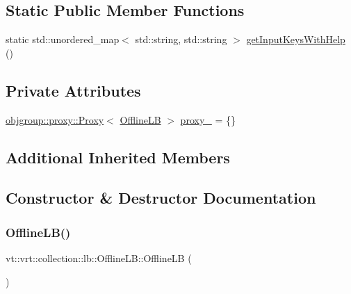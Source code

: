 \subsection*{Static Public Member Functions}
\begin{DoxyCompactItemize}
\item 
static std\+::unordered\+\_\+map$<$ std\+::string, std\+::string $>$ \hyperlink{structvt_1_1vrt_1_1collection_1_1lb_1_1_offline_l_b_a64d09cfd5734bc5b6a1e05dfaa0fbe96}{get\+Input\+Keys\+With\+Help} ()
\end{DoxyCompactItemize}
\subsection*{Private Attributes}
\begin{DoxyCompactItemize}
\item 
\hyperlink{structvt_1_1objgroup_1_1proxy_1_1_proxy}{objgroup\+::proxy\+::\+Proxy}$<$ \hyperlink{structvt_1_1vrt_1_1collection_1_1lb_1_1_offline_l_b}{Offline\+LB} $>$ \hyperlink{structvt_1_1vrt_1_1collection_1_1lb_1_1_offline_l_b_a38da27cd9b5a0e0e6582f06c07e1f3d5}{proxy\+\_\+} = \{\}
\end{DoxyCompactItemize}
\subsection*{Additional Inherited Members}


\subsection{Constructor \& Destructor Documentation}
\mbox{\label{structvt_1_1vrt_1_1collection_1_1lb_1_1_offline_l_b_a99528b3cbbb7cf3a3ffe298dd7f8b98a}} 
\subsubsection{\texorpdfstring{Offline\+L\+B()}{OfflineLB()}\hspace{0.1cm}{\footnotesize\ttfamily [1/3]}}
{\footnotesize\ttfamily vt\+::vrt\+::collection\+::lb\+::\+Offline\+L\+B\+::\+Offline\+LB (\begin{DoxyParamCaption}{ }\end{DoxyParamCaption})\hspace{0.3cm}{\ttfamily [default]}}

